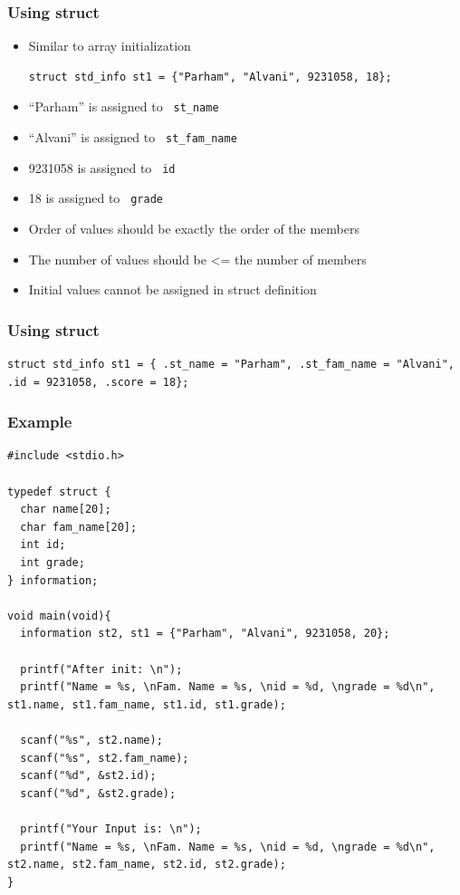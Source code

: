 \documentclass{../c-lecture}
\begin{document}
\begin{frame}[fragile]
  \frametitle{Using struct}
  \begin{itemize}
    \item Similar to array initialization
    \begin{verbatim}
struct std_info st1 = {"Parham", "Alvani", 9231058, 18};
    \end{verbatim}
    \item
      {\color{Orange} ``Parham''} is assigned to
      \texttt{\color{LimeGreen} st\_name}

    \item
      {\color{Orange} ``Alvani''} is assigned to
      \texttt{\color{LimeGreen} st\_fam\_name}

    \item
      {\color{Orange} 9231058} is assigned to
      \texttt{\color{LimeGreen} id}

    \item
      {\color{Orange} 18} is assigned to
      \texttt{\color{LimeGreen} grade}
  \end{itemize}

  \begin{block}{}
    \begin{itemize}
      \item Order of values should be exactly the order of the members
      \item The number of values should be <= the number of members
      \item Initial values cannot be assigned in struct definition
    \end{itemize}
  \end{block}
\end{frame}

\begin{frame}[fragile]
  \frametitle{Using struct}
  \begin{verbatim}
struct std_info st1 = { .st_name = "Parham", .st_fam_name = "Alvani", .id = 9231058, .score = 18};
  \end{verbatim}
\end{frame}

\begin{frame}[fragile]
  \frametitle{Example}
  \begin{verbatim}
#include <stdio.h>

typedef struct {
  char name[20];
  char fam_name[20];
  int id;
  int grade;
} information;

void main(void){
  information st2, st1 = {"Parham", "Alvani", 9231058, 20};

  printf("After init: \n");
  printf("Name = %s, \nFam. Name = %s, \nid = %d, \ngrade = %d\n", st1.name, st1.fam_name, st1.id, st1.grade);

  scanf("%s", st2.name);
  scanf("%s", st2.fam_name);
  scanf("%d", &st2.id);
  scanf("%d", &st2.grade);

  printf("Your Input is: \n");
  printf("Name = %s, \nFam. Name = %s, \nid = %d, \ngrade = %d\n", st2.name, st2.fam_name, st2.id, st2.grade);
}
  \end{verbatim}
\end{frame}
\end{document}
